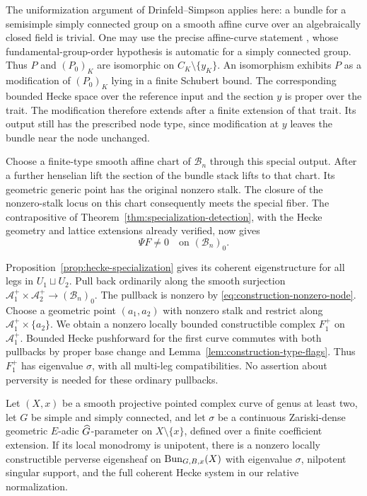 The uniformization argument of Drinfeld--Simpson applies here: a
bundle for a semisimple simply connected group on a smooth affine
curve over an algebraically closed field is trivial.  One may use the
precise affine-curve statement
\cite[Theorem~1.1]{BelkaleFakhruddin}, whose fundamental-group-order
hypothesis is automatic for a simply connected group.  Thus $P$ and
$(P_0)_K$ are isomorphic on $C_K\setminus\{y_K\}$.  An isomorphism
exhibits $P$ as a modification of $(P_0)_K$ lying in a finite Schubert
bound.  The corresponding bounded Hecke space over the reference
input and the section $y$ is proper over the trait.  The modification
therefore extends after a finite extension of that trait.  Its output
still has the prescribed node type, since modification at $y$ leaves
the bundle near the node unchanged.

Choose a finite-type smooth affine chart of $\mathcal B_n$ through
this special output.  After a further henselian lift the section of
the bundle stack lifts to that chart.  Its geometric generic point
has the original nonzero stalk.  The closure of the nonzero-stalk
locus on this chart consequently meets the special fiber.  The
contrapositive of Theorem~\ref{thm:specialization-detection}, with the
Hecke geometry and lattice extensions already verified, now gives
\begin{equation}\label{eq:construction-nonzero-node}
                  \Psi F\ne0\quad\text{on }(\mathcal B_n)_0.
\end{equation}

Proposition~\ref{prop:hecke-specialization} gives its coherent
eigenstructure for all legs in $U_1\sqcup U_2$.  Pull back ordinarily
along the smooth surjection
$\mathcal A_1^+\times\mathcal A_2^+\to(\mathcal B_n)_0$.
The pullback is nonzero by \eqref{eq:construction-nonzero-node}.
Choose a geometric point $(a_1,a_2)$ with nonzero stalk and restrict
along $\mathcal A_1^+\times\{a_2\}$.  We obtain a nonzero locally
bounded constructible complex $F_1^+$ on $\mathcal A_1^+$.
Bounded Hecke pushforward for the first curve commutes with both
pullbacks by proper base change and
Lemma~\ref{lem:construction-type-flags}.  Thus $F_1^+$ has eigenvalue
$\sigma$, with all multi-leg compatibilities.  No assertion about
perversity is needed for these ordinary pullbacks.

\begin{proposition}\label{prop:charzero-existence}
Let $(X,x)$ be a smooth projective pointed complex curve of genus at
least two, let $G$ be simple and simply connected, and let $\sigma$ be
a continuous Zariski-dense geometric $E$-adic $\widehat G$-parameter on
$X\setminus\{x\}$, defined over a finite coefficient extension.
If its local monodromy is unipotent, there is a nonzero locally
constructible perverse eigensheaf on $\operatorname{Bun}_{G,B,x}(X)$ with eigenvalue
$\sigma$, nilpotent singular support, and the full coherent Hecke
system in our relative normalization.
\end{proposition}

